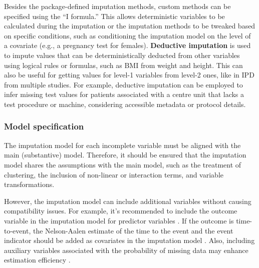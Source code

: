 \documentclass[
  article]{jss}
\begin{document}
Besides the package-defined imputation methods, custom methods can be
specified using the ``I formula.'' This allows deterministic variables
to be calculated during the imputation or the imputation methods to be
tweaked based on specific conditions, such as conditioning the
imputation model on the level of a covariate (e.g., a pregnancy test for
females). \textbf{Deductive imputation} is used to impute values that
can be deterministically deducted from other variables using logical
rules or formulas, such as BMI from weight and height. This can also be
useful for getting values for level-1 variables from level-2 ones, like
in IPD from multiple studies. For example, deductive imputation can be
employed to infer missing test values for patients associated with a
centre unit that lacks a test procedure or machine, considering
accessible metadata or protocol details.

\subsubsection{Model specification}\label{model-specification}

The imputation model for each incomplete variable must be aligned with
the main (substantive) model. Therefore, it should be ensured that the
imputation model shares the assumptions with the main model, such as the
treatment of clustering, the inclusion of non-linear or interaction
terms, and variable transformations.

However, the imputation model can include additional variables without
causing compatibility issues. For example, it's recommended to include
the outcome variable in the imputation model for predictor variables
\citep{moons2006}. If the outcome is time-to-event, the Nelson-Aalen
estimate of the time to the event and the event indicator should be
added as covariates in the imputation model \citep{white2009}. Also,
including auxiliary variables associated with the probability of missing
data may enhance estimation efficiency \citep{hardt2012}.
\end{document}
